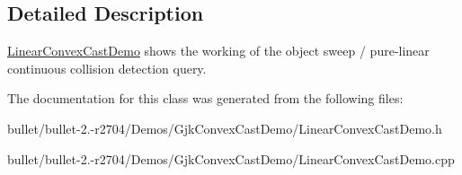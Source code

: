 \subsection{Detailed Description}
\hyperlink{class_linear_convex_cast_demo}{Linear\+Convex\+Cast\+Demo} shows the working of the object sweep / pure-\/linear continuous collision detection query. 

The documentation for this class was generated from the following files\+:\begin{DoxyCompactItemize}
\item 
bullet/bullet-\/2.-\/r2704/\+Demos/\+Gjk\+Convex\+Cast\+Demo/Linear\+Convex\+Cast\+Demo.\+h\item 
bullet/bullet-\/2.-\/r2704/\+Demos/\+Gjk\+Convex\+Cast\+Demo/Linear\+Convex\+Cast\+Demo.\+cpp\end{DoxyCompactItemize}

